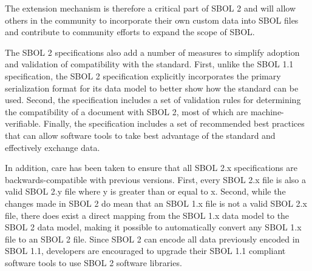 The extension mechanism is therefore a critical part of SBOL 2 and will allow others in the community to incorporate their own custom data into SBOL files and contribute to community efforts to expand the scope of SBOL.


The SBOL 2 specifications also add a number of measures to simplify adoption and validation of compatibility with the standard.
First, unlike the SBOL 1.1 specification, the SBOL 2 specification explicitly incorporates the primary serialization format for its data model to better show how the standard can be used. Second, the specification includes a set of validation rules for determining the compatibility of a document with SBOL 2, most of which are machine-verifiable. Finally, the specification includes a set of recommended best practices that can allow software tools to take best advantage of the standard and effectively exchange data.

In addition, care has been taken to ensure that all SBOL 2.x specifications are backwards-compatible with previous versions.
First, every SBOL 2.x file is also a valid SBOL 2.y file where y is greater than or equal to x.
Second, while the changes made in SBOL 2 do mean that an SBOL 1.x file is not a valid SBOL 2.x file, there does exist a direct mapping from the SBOL 1.x data model to the SBOL 2 data model, making it possible to automatically convert any SBOL 1.x file to an SBOL 2 file.
Since SBOL 2 can encode all data previously encoded in SBOL 1.1, developers are encouraged to upgrade their SBOL 1.1 compliant software tools to use SBOL 2 software libraries. 

